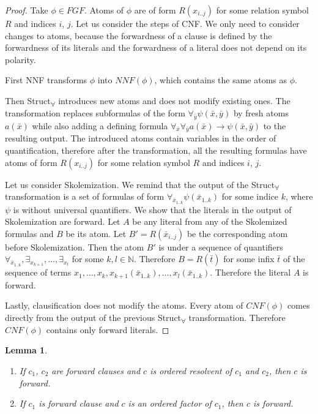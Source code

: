 \documentclass[english, shortabstract]{iithesis}
\theoremstyle{definition} \newtheorem{definition}{Definition}[chapter]
\theoremstyle{remark} \newtheorem{remark}[definition]{Observation}
\theoremstyle{plain} \newtheorem{theorem}[definition]{Theorem}
\theoremstyle{plain} \newtheorem{lemma}[definition]{Lemma}
\begin{document}
\begin{proof}
Take $\phi \in \mathit{FGF}$. Atoms of $\phi$ are of form $R(x_{i..j})$ for some relation symbol $R$ and indices $i$, $j$.
Let us consider the steps of CNF. We only need to consider changes to atoms, 
because the forwardness of a clause is defined by the forwardness of its literals and the forwardness of a literal does not depend on its polarity.

First NNF transforms $\phi$ into $NNF(\phi)$, which contains the same atoms as $\phi$.

Then Struct\textsubscript{{$\forall$}} introduces new atoms and does not modify existing ones.
The transformation replaces subformulas of the form $\forall_{\bar{y}} \psi(\bar{x},\bar{y})$ 
by fresh atoms $a(\bar{x})$ while also adding a defining formula $\forall_{\bar{x}} \forall_{\bar{y}} a(\bar{x}) \rightarrow \psi(\bar{x},\bar{y})$ to the resulting output.
The introduced atoms contain variables in the order of quantification, therefore after the transformation, all the resulting formulas have atoms of form $R(x_{i..j})$ for some relation symbol $R$ and indices $i$, $j$.

Let us consider Skolemization. 
We remind that the output of the Struct\textsubscript{{$\forall$}} transformation is a set of formulas
of form $\forall_{\bar{x}_{1..k}} \psi(\bar{x}_{1..k})$ for some indice $k$, where $\psi$ is without universal quantifiers. 
We show that the literals in the output of Skolemization are forward. 
Let $A$ be any literal from any of the Skolemized formulas and $B$ be its atom. Let $B'=R(\bar{x}_{i..j})$ be the corresponding atom 
before Skolemization. Then the atom $B'$ is under a sequence of quantifiers $\forall_{\bar{x}_{1..k}}, \exists_{x_{k+1}}, \dots, \exists_{x_{l}}$ for some $k,l \in \mathbb{N}$.
Therefore $B=R(\bar{t})$ for some infix $\bar{t}$ of the sequence of terms $x_{1}, \dots, x_k, x_{k+1}(\bar{x}_{1..k}), \dots, x_{l}(\bar{x}_{1..k})$. 
Therefore the literal $A$ is forward.

Lastly, clausification does not modify the atoms. 
Every atom of $\mathit{CNF}(\phi)$ comes directly from the output of the previous Struct\textsubscript{{$\forall$}} transformation.
Therefore $\mathit{CNF}(\phi)$ contains only forward literals.
\end{proof}

\begin{lemma}
\begin{enumerate}\label{lem:step}
    \item If $c_1$, $c_2$ are forward clauses and $c$ is ordered resolvent of $c_1$ and $c_2$, then $c$ is forward.
    \item If $c_1$ is forward clause and $c$ is an ordered factor of $c_1$, then $c$ is forward.
\end{enumerate}
\end{lemma}
\end{document}
